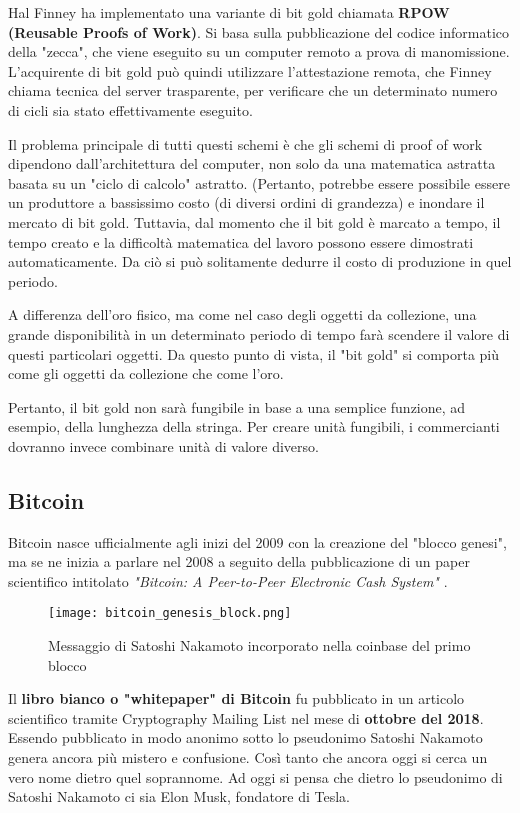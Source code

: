 Hal Finney ha implementato una variante di bit gold chiamata \textbf{RPOW (Reusable Proofs of Work)}. Si basa sulla pubblicazione del codice informatico della "zecca", che viene eseguito su un computer remoto a prova di manomissione. L'acquirente di bit gold può quindi utilizzare l'attestazione remota, che Finney chiama tecnica del server trasparente, per verificare che un determinato numero di cicli sia stato effettivamente eseguito.

Il problema principale di tutti questi schemi è che gli schemi di proof of work dipendono dall'architettura del computer, non solo da una matematica astratta basata su un "ciclo di calcolo" astratto. (Pertanto, potrebbe essere possibile essere un produttore a bassissimo costo (di diversi ordini di grandezza) e inondare il mercato di bit gold. Tuttavia, dal momento che il bit gold è marcato a tempo, il tempo creato e la difficoltà matematica del lavoro possono essere dimostrati automaticamente. Da ciò si può solitamente dedurre il costo di produzione in quel periodo.

A differenza dell'oro fisico, ma come nel caso degli oggetti da collezione, una grande disponibilità in un determinato periodo di tempo farà scendere il valore di questi particolari oggetti. Da questo punto di vista, il "bit gold" si comporta più come gli oggetti da collezione che come l'oro.

Pertanto, il bit gold non sarà fungibile in base a una semplice funzione, ad esempio, della lunghezza della stringa. Per creare unità fungibili, i commercianti dovranno invece combinare unità di valore diverso.

\subsection{Bitcoin}
Bitcoin nasce ufficialmente agli inizi del 2009 con la creazione del "blocco genesi", ma se ne inizia a parlare nel 2008 a seguito della pubblicazione di un paper scientifico intitolato \textit{"Bitcoin: A Peer-to-Peer Electronic Cash System"} \cite{bitcoin-white-paper}.

\begin{figure}[h]
  \centering
  \texttt{[image: bitcoin\_genesis\_block.png]}
  \caption{Messaggio di Satoshi Nakamoto incorporato nella coinbase del primo blocco}
  \label{fig:bitcoin_genesis_block}
\end{figure}

Il \textbf{libro bianco o "whitepaper" di Bitcoin} fu pubblicato in un articolo scientifico tramite Cryptography Mailing List nel mese di \textbf{ottobre del 2018}. Essendo pubblicato in modo anonimo sotto lo pseudonimo Satoshi Nakamoto genera ancora più mistero e confusione. Così tanto che ancora oggi si cerca un vero nome dietro quel soprannome. Ad oggi si pensa che dietro lo pseudonimo di Satoshi Nakamoto ci sia Elon Musk, fondatore di Tesla.

